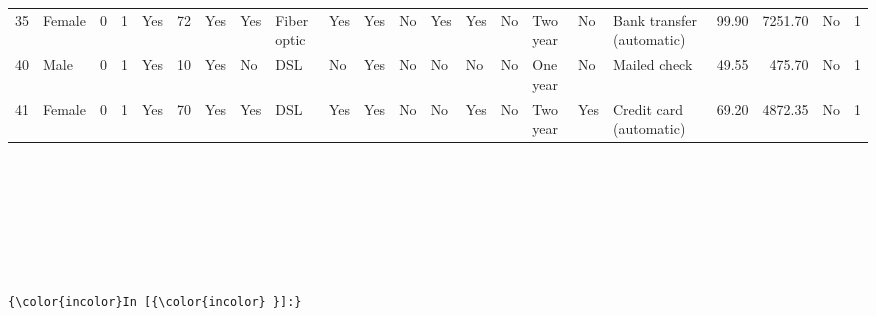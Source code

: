 \documentclass[8pt,onecolumn,aps,pra]{revtex4-1}
\begin{document}
{\begin{tabular}{llrrlrllllllllllllrrlr}
35 &  Female &              0 &        1 &        Yes &      72 &          Yes &               Yes &     Fiber optic &                  Yes &                  Yes &                   No &                  Yes &                  Yes &                   No &        Two year &               No &  Bank transfer (automatic) &           99.90 &       7251.70 &    No &      1 \\
40 &    Male &              0 &        1 &        Yes &      10 &          Yes &                No &             DSL &                   No &                  Yes &                   No &                   No &                   No &                   No &        One year &               No &               Mailed check &           49.55 &        475.70 &    No &      1 \\
41 &  Female &              0 &        1 &        Yes &      70 &          Yes &               Yes &             DSL &                  Yes &                  Yes &                   No &                   No &                  Yes &                   No &        Two year &              Yes &    Credit card (automatic) &           69.20 &       4872.35 &    No &      1 \\
\bottomrule
\end{tabular}
}

    
    \begin{center}
    \end{center}
    { \hspace*{\fill} \\}
    
    \begin{center}
    \end{center}
    { \hspace*{\fill} \\}
    
    \begin{center}
    \end{center}
    { \hspace*{\fill} \\}
    
    \begin{center}
    \end{center}
    { \hspace*{\fill} \\}
    \begin{Verbatim}[commandchars=\\\{\}]
{\color{incolor}In [{\color{incolor} }]:} 
\end{Verbatim}
\end{document}
